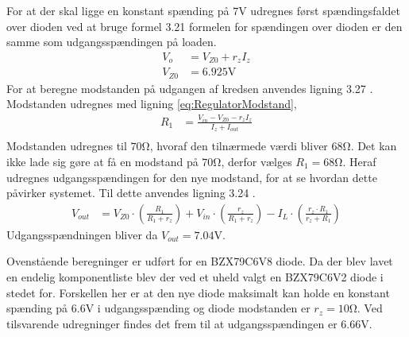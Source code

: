 For at der skal ligge en konstant spænding på $7 \si{\volt}$ udregnes først spændingsfaldet over dioden ved at bruge formel 3.21 \cite[Side. 146]{Sedra19uu} formelen for spændingen over dioden er den samme som udgangsspændingen på loaden. 
\begin{align}
	V_o & = V_{Z0} + r_z I_z \\
	V_{Z0} & = 6.925 \si{\volt}
	\end{align}
For at beregne modstanden på udgangen af kredsen anvendes ligning 3.27 \cite[Side. 149]{Sedra19uu}.
Modstanden udregnes med ligning \ref{eq:RegulatorModstand}, 
\begin{align}
	R_1 & = \frac{V_{in}-V_{Z0}-r_z I_z}{I_z+I_{out}} \label{eq:RegulatorModstand} \\
\end{align}
Modstanden udregnes til $70 \si{\ohm}$, hvoraf den tilnærmede værdi bliver $68 \si{\ohm}$.
Det kan ikke lade sig gøre at få en modstand på $70 \si{\ohm}$, derfor vælges $R_1 = 68 \si{\ohm}$.
Heraf udregnes udgangsspændingen for den nye modstand, for at se hvordan dette påvirker systemet.
Til dette anvendes ligning 3.24 \cite[Side. 149]{Sedra19uu}.
\begin{align}
	V_{out} & = V_{Z0} \cdot \left( \frac{R_1}{R_1+r_z} \right) + V_{in} \cdot \left( \frac{r_z}{R_1+r_z} \right) - I_L \cdot \left( \frac{r_z \cdot R_1}{r_z+R_1} \right)
\end{align}
Udgangsspændningen bliver da $V_{out} = 7.04 \si{\volt}$.

Ovenstående beregninger er udført for en BZX79C6V8 diode. 
Da der blev lavet en endelig komponentliste blev der ved et uheld valgt en BZX79C6V2 diode i stedet for. 
Forskellen her er at den nye diode maksimalt kan holde en konstant spænding på $6.6 \si{\volt}$ i udgangsspænding og diode modstanden er $r_z = 10 \si{\ohm}$.
Ved tilsvarende udregninger findes det frem til at udgangsspændingen er $6.66 \si{\volt}$.